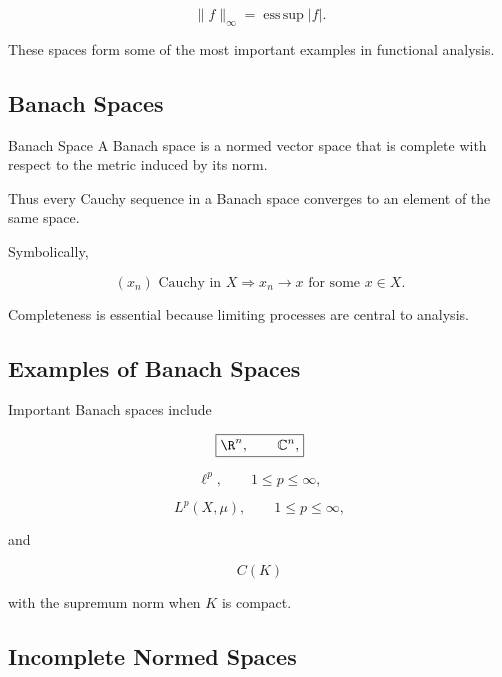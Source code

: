 \[
\boxed{
\|f\|_\infty
=
\operatorname*{ess\,sup}|f|.
}
\]

These spaces form some of the most important examples in functional
analysis.

\subsection{Banach Spaces}
\label{subsec:banach-spaces}

\begin{definitionbox}{Banach Space}
A Banach space is a normed vector space that is complete with respect to
the metric induced by its norm.
\end{definitionbox}

Thus every Cauchy sequence in a Banach space converges to an element of
the same space.

Symbolically,

\[
\boxed{
(x_n)\text{ Cauchy in }X
\Longrightarrow
x_n\to x
\text{ for some }x\in X.
}
\]

Completeness is essential because limiting processes are central to
analysis.

\subsection{Examples of Banach Spaces}
\label{subsec:examples-banach-spaces}

Important Banach spaces include

\[
\boxed{
\R^n,
\qquad
\mathbb{C}^n,
}
\]

\[
\boxed{
\ell^p,
\qquad
1\leq p\leq\infty,
}
\]

\[
\boxed{
L^p(X,\mu),
\qquad
1\leq p\leq\infty,
}
\]

and

\[
\boxed{
C(K)
}
\]

with the supremum norm when \(K\) is compact.

\subsection{Incomplete Normed Spaces}
\label{subsec:incomplete-normed-spaces}

